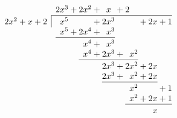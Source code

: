 $$
\begin{array}{r@{}l@{}c@{}r@{}l@{}c@{}rc@{}r@{}l@{}c@{}r@{}l@{}c@{}r@{}l@{}c@{}r@{}l@{}c@{}r@{}l@{}c@{}r@{}}
&&&&&&&& 2 & x^3 & {}+{} & 2 & x^2 & {}+{} &  & x & {}+{} & 2 &  &  &  &  &  & \\
\cline{8-24}\rule{0pt}{2.5ex}
2 & x^2 & {}+{} &  & x & {}+{} & 2 & \multicolumn{1}{|l@{}}{}  &  & x^5 &  &  &  & {}+{} & 2 & x^3 &  &  &  & {}+{} & 2 & x & {}+{} & 1 \\
&&&&&& &  &  & x^5 & {}+{} & 2 & x^4 & {}+{} & & x^3 &  &  &  &  &  &  &  &  \\
\cline{9-16}\rule{0pt}{2.5ex}
&&&&&& &  &  &  &  &  & x^4 & {}+{} &  & x^3 &  & &  &  &  &  &  &  \\
&&&&&& &  &  &  &  &  & x^4 & {}+{} & 2 & x^3 & {}+{} &  & x^2 &  &  &  &  &  \\
\cline{12-19}\rule{0pt}{2.5ex}
&&&&&& &  &  &  &  &  &  &  & 2 & x^3 & {}+{} & 2 & x^2 & {}+{} & 2 & x &  &  \\
&&&&&& &  &  &  &  &  &  &  & 2 & x^3 & {}+{} & & x^2 & {}+{} & 2 & x &  &  \\
\cline{15-22}\rule{0pt}{2.5ex}
&&&&&& &  &  &  &  &  &  &  &  &  &  &  & x^2 &  & &  & {}+{} & 1 \\
&&&&&& &  &  &  &  &  &  &  &  &  &  &  & x^2 & {}+{} & 2 & x & {}+{} & 1 \\
\cline{18-24}\rule{0pt}{2.5ex}
&&&&&& &  &  &  &  &  &  &  &  &  &  &  &  &  &  & x &  &  \\
\end{array}
$$